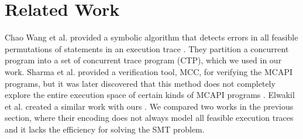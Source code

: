 \section{Related Work}
Chao Wang et al. provided a symbolic algorithm that detects errors in all feasible permutations of statements in an execution trace \cite{wang:fse09}. They partition a concurrent program into a set of concurrent trace program (CTP), which we used in our work. Sharma et al. provided a verification tool, MCC, for verifying the MCAPI programs, but it was later discovered that this method does not completely explore the entire execution space of certain kinds of MCAPI programs \cite{sharma:fmcad09}. Elwakil et al. created a similar work with ours \cite{elwakil:atva10,elwakil:padtad10}. We compared two works in the previous section, where their encoding does not always model all feasible execution traces and it lacks the efficiency for solving the SMT problem. 
